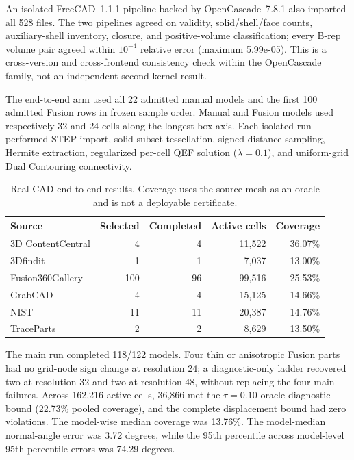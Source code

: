 An isolated FreeCAD~1.1.1 pipeline backed by OpenCascade~7.8.1 also imported all
528 files.  The two pipelines agreed on validity, solid/shell/face counts,
auxiliary-shell inventory, closure, and positive-volume classification; every
B-rep volume pair agreed within \(10^{-4}\) relative error (maximum
5.99e-05).  This is a
cross-version and cross-frontend consistency check within the OpenCascade
family, not an independent second-kernel result.

The end-to-end arm used all 22 admitted manual models and the first 100 admitted
Fusion rows in frozen sample order.  Manual and Fusion models used respectively
32 and 24 cells along the longest box axis.  Each isolated run performed STEP
import, solid-subset tessellation, signed-distance sampling, Hermite extraction,
regularized per-cell QEF solution (\(\lambda=0.1\)), and uniform-grid Dual
Contouring connectivity.

\begin{table}[t]
\centering
\caption{Real-CAD end-to-end results. Coverage uses the source mesh as an
oracle and is not a deployable certificate.}
\label{tab:real-cad-dc}
\begin{tabular}{lrrrr}
\toprule
Source & Selected & Completed & Active cells & Coverage \\
\midrule
3D ContentCentral & 4 & 4 & 11,522 & 36.07\% \\
3Dfindit & 1 & 1 & 7,037 & 13.00\% \\
Fusion360Gallery & 100 & 96 & 99,516 & 25.53\% \\
GrabCAD & 4 & 4 & 15,125 & 14.66\% \\
NIST & 11 & 11 & 20,387 & 14.76\% \\
TraceParts & 2 & 2 & 8,629 & 13.50\% \\
\bottomrule
\end{tabular}
\end{table}

The main run completed 118/122 models.  Four thin or anisotropic Fusion parts
had no grid-node sign change at resolution 24; a diagnostic-only ladder recovered
two at resolution 32 and two at resolution 48, without replacing the four main
failures.  Across 162,216 active cells, 36,866 met the \(\tau=0.10\)
oracle-diagnostic bound (22.73\% pooled coverage), and the complete displacement
bound had zero violations.  The model-wise median coverage was 13.76\%.
The model-median normal-angle error was 3.72 degrees, while the 95th percentile
across model-level 95th-percentile errors was 74.29 degrees.

